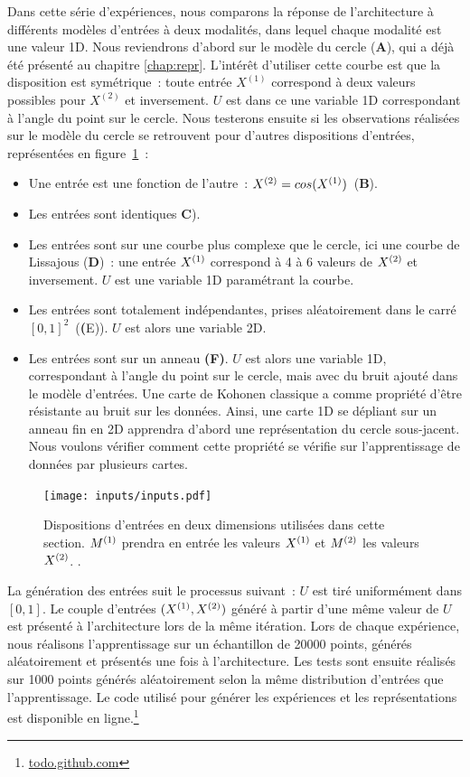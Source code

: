 \documentclass[../main]{subfiles}
\begin{document}
Dans cette série d'expériences, nous comparons la réponse de l'architecture à différents modèles d'entrées à deux modalités, dans lequel chaque modalité est une valeur 1D.
Nous reviendrons d'abord sur le modèle du cercle (\textbf{A}), qui a déjà été présenté au chapitre \ref{chap:repr}. L'intérêt d'utiliser cette courbe est que la disposition est symétrique~: toute entrée $X^{(1)}$ correspond à deux valeurs possibles pour $X^{(2)}$ et inversement. $U$ est dans ce une variable 1D correspondant à l'angle du point sur le cercle.
Nous testerons ensuite si les observations réalisées sur le modèle du cercle se retrouvent pour d'autres dispositions d'entrées, représentées en figure~\ref{fig:input_list}~:
\begin{itemize}
	\item Une entrée est une fonction de l'autre~: $X^{({2})} = cos(X^{({1})})$~(\textbf{B}).
	\item Les entrées sont identiques \textbf{C}).
	\item Les entrées sont sur une courbe plus complexe que le cercle, ici une courbe de Lissajous (\textbf{D})~: une entrée $X^{({1})}$ correspond à 4 à 6 valeurs de $X^{({2})}$ et inversement. $U$ est une variable 1D paramétrant la courbe.
	\item Les entrées sont totalement indépendantes, prises aléatoirement dans le carré $[0,1]^2$~(\textbf({E})). $U$ est alors une variable 2D.
	\item Les entrées sont sur un anneau \textbf{(F)}. $U$ est alors une variable 1D, correspondant à l'angle du point sur le cercle, mais avec du bruit ajouté dans le modèle d'entrées. 
	Une carte de Kohonen classique a comme propriété d'être résistante au bruit sur les données. Ainsi, une carte 1D se dépliant sur un anneau fin en 2D apprendra d'abord une représentation du cercle sous-jacent. Nous voulons vérifier comment cette propriété se vérifie sur l'apprentissage de données par plusieurs cartes.
\end{itemize}

\begin{figure}[h!]
	\texttt{[image: inputs/inputs.pdf]}
	\caption{Dispositions d'entrées en deux dimensions utilisées dans cette section. $M^{({1})}$ prendra en entrée les valeurs $X^{({1})}$ et $M^{({2})}$ les valeurs $X^{({2})}$. \label{fig:input_list}.}
\end{figure}

La génération des entrées suit le processus suivant~: $U$ est tiré uniformément dans $[0,1]$. Le couple d'entrées $(X^{({1})},X^{({2})})$ généré à partir d'une même valeur de $U$ est présenté à l'architecture lors de la même itération.
Lors de chaque expérience, nous réalisons l'apprentissage sur un échantillon de 20000 points, générés aléatoirement et présentés une fois à l'architecture. 
Les tests sont ensuite réalisés sur 1000 points générés aléatoirement selon la même distribution d'entrées que l'apprentissage.
Le code utilisé pour générer les expériences et les représentations est disponible en ligne.\footnote{\url{todo.github.com}}
\end{document}

